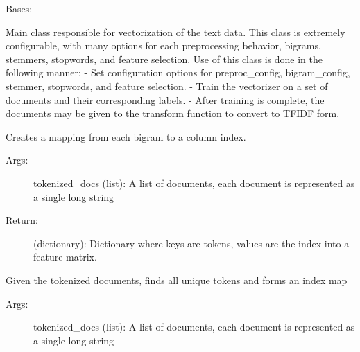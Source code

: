 \documentclass[letterpaper,10pt,english]{sphinxmanual}
\begin{document}
\begin{fulllineitems}
\label{\detokenize{KUHERD:KUHERD.HerdVectorizer.HerdVectorizer}}
Bases: 

Main class responsible for vectorization of the text data. This class is extremely configurable, with many
options for each preprocessing behavior, bigrams, stemmers, stopwords, and feature selection. Use of this
class is done in the following manner:
- Set configuration options for preproc\_config, bigram\_config, stemmer, stopwords, and feature selection.
- Train the vectorizer on a set of documents and their corresponding labels.
- After training is complete, the documents may be given to the transform function to convert to TFIDF form.

\begin{fulllineitems}
\label{\detokenize{KUHERD:KUHERD.HerdVectorizer.HerdVectorizer.create_bigram_index_map}}
Creates a mapping from each bigram to a column index.
\begin{description}
\item[{Args:}] \leavevmode
tokenized\_docs (list): A list of documents, each document is represented as a single long string

\item[{Return:}] \leavevmode
(dictionary): Dictionary where keys are tokens, values are the index into a feature matrix.

\end{description}

\end{fulllineitems}


\begin{fulllineitems}
\label{\detokenize{KUHERD:KUHERD.HerdVectorizer.HerdVectorizer.create_token_index_map}}
Given the tokenized documents, finds all unique tokens and forms an index map
\begin{description}
\item[{Args:}] \leavevmode
tokenized\_docs (list): A list of documents, each document is represented as a single long string


\end{description}
\end{fulllineitems}
\end{fulllineitems}
\end{document}
